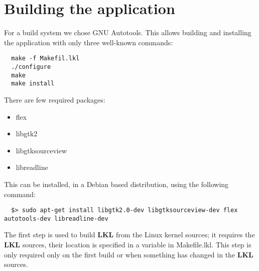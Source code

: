 \chapter{Building the application}

For a build system we chose GNU Autotools. This allows building
and installing the application with only three well-known commands:

\lstset{language=bash,caption=Build System,label=lst:building}
\begin{lstlisting}
  make -f Makefil.lkl
  ./configure
  make
  make install
\end{lstlisting}

There are few required packages:
\begin{itemize}
  \item flex
  \item libgtk2
  \item libgtksourceview
  \item libreadline
\end{itemize}

This can be installed, in a Debian based distribution, using the following 
command:
\lstset{language=zsh,caption=Required packages,label=lst:bpacakges}
\begin{lstlisting}
  $> sudo apt-get install libgtk2.0-dev libgtksourceview-dev flex autotools-dev libreadline-dev
\end{lstlisting}

The first step is used to build \textbf{LKL} from the Linux kernel sources; it
requires the \textbf{LKL} sources, their location is specified in a variable in
Makefile.lkl. This step is only required only on the first build or
when something has changed in the \textbf{LKL} sources.
